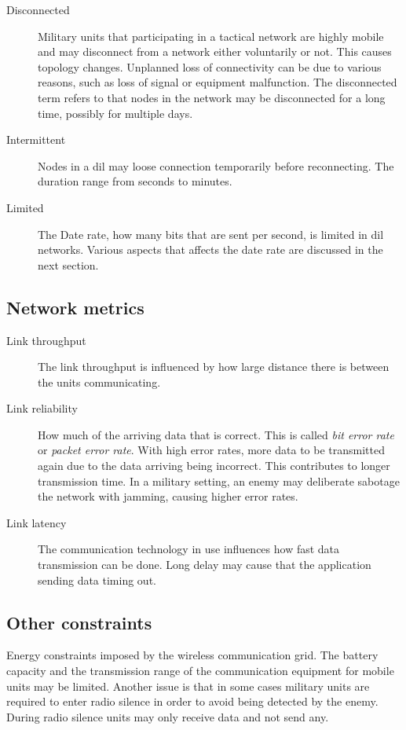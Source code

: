 \documentclass[USenglish]{ifimaster}
\begin{document}
\begin{description}
\item[Disconnected]
Military units that participating in a tactical network are highly mobile
and may disconnect from a network either voluntarily or not. This causes
topology changes. Unplanned loss of connectivity can be due to various reasons,
such as loss of signal or equipment malfunction.  The disconnected term refers
to that nodes in the network may be disconnected for a long time, possibly for
multiple days.
\item[Intermittent]
Nodes in a \gls{dil} may loose connection temporarily before reconnecting. The
duration range from seconds to minutes.

\item[Limited] The Date rate, how many bits that are sent per second, is limited
in \gls{dil} networks. Various aspects that affects the date rate are discussed
in the next section.

\end{description}

\subsection{Network metrics}
\begin{description}

\item[Link throughput] The link throughput is influenced by how large distance
there is between the units communicating.

\item[Link reliability] How much of the arriving data that is correct. This is
called \textit{bit error rate} or \textit{packet error rate}. With high error
rates, more data to be transmitted again due to the data arriving being
incorrect. This contributes to longer transmission time. In a military setting,
an enemy may deliberate sabotage the network with jamming, causing higher error
rates.

\item[Link latency] The communication technology in use influences how fast data
transmission can be done. Long delay may cause that the application sending data
timing out.

\end{description}

\subsection{Other constraints}
Energy constraints imposed by the wireless communication grid. The battery
capacity and the transmission range of the communication equipment for mobile
units may be limited. Another issue is that in some cases military units are
required to enter radio silence in order to avoid being detected by the enemy.
During radio silence units may only receive data and not send any.
\end{document}
